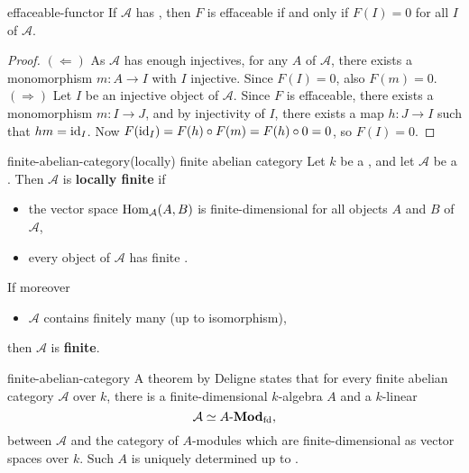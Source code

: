 \begin{example}{effaceable-functor}
    If $\mathcal{A}$ has , then $F$ is effaceable if and only if $F(I) = 0$ for all  $I$ of $\mathcal{A}$.
    \begin{proof}
        $(\Leftarrow)$ As $\mathcal{A}$ has enough injectives, for any $A$ of $\mathcal{A}$, there exists a monomorphism $m : A \to I$ with $I$ injective. Since $F(I) = 0$, also $F(m) = 0$.
        $(\Rightarrow)$ Let $I$ be an injective object of $\mathcal{A}$. Since $F$ is effaceable, there exists a monomorphism $m : I \to J$, and by injectivity of $I$, there exists a map $h : J \to I$ such that $hm = \text{id}_I$. Now $F(\text{id}_I) = F(h) \circ F(m) = F(h) \circ 0 = 0$, so $F(I) = 0$.
    \end{proof}
\end{example}

\begin{topic}{finite-abelian-category}{(locally) finite abelian category}
    Let $k$ be a , and let $\mathcal{A}$ be a . Then $\mathcal{A}$ is \textbf{locally finite} if
    \begin{itemize}
        \item the vector space $\text{Hom}_\mathcal{A}(A, B)$ is finite-dimensional for all objects $A$ and $B$ of $\mathcal{A}$,
        \item every object of $\mathcal{A}$ has finite .
    \end{itemize}
    If moreover
    \begin{itemize}
        \item $\mathcal{A}$ contains finitely many  (up to isomorphism),
    \end{itemize}
    then $\mathcal{A}$ is \textbf{finite}.
\end{topic}

\begin{example}{finite-abelian-category}
    A theorem by Deligne states that for every finite abelian category $\mathcal{A}$ over $k$, there is a finite-dimensional $k$-algebra $A$ and a $k$-linear 
    \[ \mathcal{A} \simeq A\textup{-}\textbf{Mod}_\textup{fd} , \]
    between $\mathcal{A}$ and the category of $A$-modules which are finite-dimensional as vector spaces over $k$. Such $A$ is uniquely determined up to .
\end{example}

